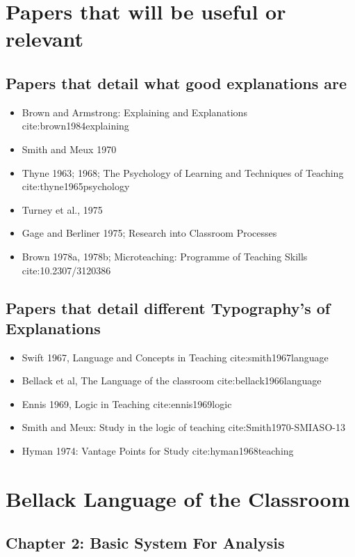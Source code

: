 \documentclass[10pt, letterpaper]{article}
\begin{document}
\section*{Papers that will be useful or relevant}
\label{sec:orgd5c1f20}

\subsection*{Papers that detail what good explanations are}
\label{sec:orge2d7b49}
\begin{itemize}
\item Brown and Armstrong: Explaining and Explanations cite:brown1984explaining
\item Smith and Meux 1970
\item Thyne 1963; 1968; The Psychology of Learning and Techniques of Teaching cite:thyne1965psychology
\item Turney et al., 1975
\item Gage and Berliner 1975; Research into Classroom Processes
\item Brown 1978a, 1978b; Microteaching: Programme of Teaching Skills cite:10.2307/3120386
\end{itemize}

\subsection*{Papers that detail different Typography's of Explanations}
\label{sec:org5e16833}
\begin{itemize}
\item Swift 1967, Language and Concepts in Teaching cite:smith1967language
\item Bellack et al, The Language of the classroom cite:bellack1966language
\item Ennis 1969, Logic in Teaching cite:ennis1969logic
\item Smith and Meux: Study in the logic of teaching cite:Smith1970-SMIASO-13
\item Hyman 1974: Vantage Points for Study cite:hyman1968teaching
\end{itemize}


\section*{Bellack Language of the Classroom}
\label{sec:org22c161e}

\subsection*{Chapter 2: Basic System For Analysis}
\label{sec:org8dc1f9f}
\end{document}
